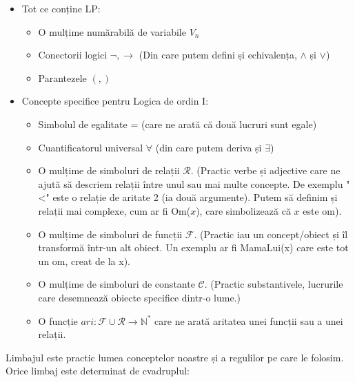 \begin{itemize}

	\item Tot ce conține LP:

	      \begin{itemize}

		      \item O mulțime numărabilă de variabile \( V_n \)
		      \item Conectorii logici \( \neg, \to \) (Din care putem defini și echivalența, \( \land \) și \( \lor \))
		      \item Parantezele \( (, ) \)

	      \end{itemize}

	\item Concepte specifice pentru Logica de ordin I:

	      \begin{itemize}

		      \item Simbolul de egalitate = (care ne arată că două lucruri sunt egale)
		      \item Cuantificatorul universal \( \forall \) (din care putem deriva și \( \exists \))
		      \item O mulțime de simboluri de relații \( \mathcal{R} \). (Practic verbe și adjective care ne ajută să descriem relații între unul sau mai multe concepte. De exemplu "<" este o relație
		            de aritate 2 (ia două argumente). Putem să definim și relații mai complexe, cum ar fi Om(\( x \)), care simbolizează că \( x \) este om).
		      \item O mulțime de simboluri de funcții \( \mathcal{F} \). (Practic iau un concept/obiect și îl transformă într-un alt obiect. Un exemplu ar fi MamaLui(x) care este tot un om, creat de la x).
		      \item O mulțime de simboluri de constante \( \mathcal{C} \). (Practic substantivele, lucrurile care desemnează obiecte specifice dintr-o lume.)
		      \item O funcție \( ari : \mathcal{F} \cup \mathcal{R} \to \mathbb{N}^* \) care ne arată aritatea unei funcții sau a unei relații.

	      \end{itemize}

\end{itemize}

Limbajul este practic lumea conceptelor noastre și a regulilor pe care le folosim. Orice limbaj este determinat de cvadruplul:


